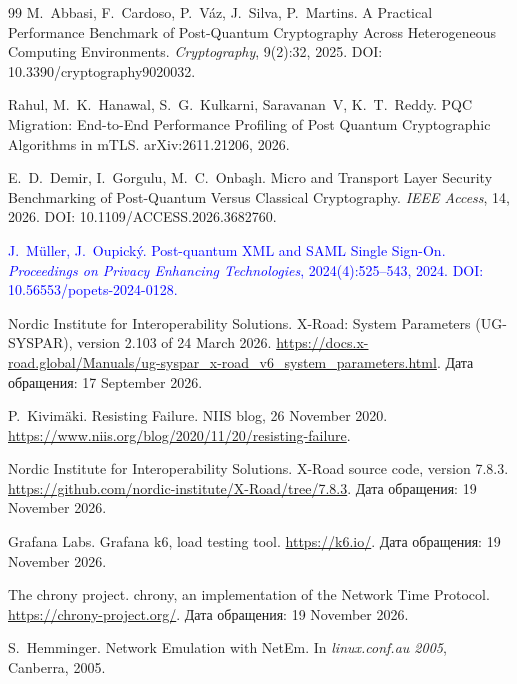 \documentclass[conference,a4paper]{IEEEtran}
\newcommand{\newtext}[1]{{\color{blue}#1}}
\begin{document}
\begin{thebibliography}{99}
\newtext{M.~Abbasi, F.~Cardoso, P.~V{\'a}z, J.~Silva, P.~Martins.
\newblock A Practical Performance Benchmark of Post-Quantum Cryptography Across Heterogeneous
Computing Environments.
\newblock \emph{Cryptography}, 9(2):32, 2025.
\newblock DOI: 10.3390/cryptography9020032.}

\newtext{Rahul, M.~K.~Hanawal, S.~G.~Kulkarni, Saravanan~V, K.~T.~Reddy.
\newblock PQC Migration: End-to-End Performance Profiling of Post Quantum Cryptographic Algorithms in
mTLS.
\newblock arXiv:2611.21206, 2026.}

\newtext{E.~D.~Demir, I.~Gorgulu, M.~C.~Onba{\c{s}}l{\i}.
\newblock Micro and Transport Layer Security Benchmarking of Post-Quantum Versus Classical
Cryptography.
\newblock \emph{IEEE Access}, 14, 2026.
\newblock DOI: 10.1109/ACCESS.2026.3682760.}

\textcolor{blue}{J.~M{\"u}ller, J.~Oupick{\'y}.
\newblock Post-quantum XML and SAML Single Sign-On.
\newblock \emph{Proceedings on Privacy Enhancing Technologies}, 2024(4):525--543, 2024.
\newblock DOI: 10.56553/popets-2024-0128.}

Nordic Institute for Interoperability Solutions.
\newblock X-Road: System Parameters (UG-SYSPAR)\newtext{, version 2.103 of 24 March 2026}.
\newblock \url{https://docs.x-road.global/Manuals/ug-syspar_x-road_v6_system_parameters.html}.
\newblock Дата обращения: 17 September 2026.

P.~Kivim\"{a}ki.
\newblock Resisting Failure.
\newblock NIIS blog, \newtext{26} November 2020.
\newblock \url{https://www.niis.org/blog/2020/11/20/resisting-failure}.
\newblock \newtext{Дата обращения: 19 November 2026.}

\newtext{Nordic Institute for Interoperability Solutions.
\newblock X-Road source code, version 7.8.3.
\newblock \url{https://github.com/nordic-institute/X-Road/tree/7.8.3}.
\newblock Дата обращения: 19 November 2026.}

\newtext{Grafana Labs.
\newblock Grafana k6, load testing tool.
\newblock \url{https://k6.io/}.
\newblock Дата обращения: 19 November 2026.}

\newtext{The chrony project.
\newblock chrony, an implementation of the Network Time Protocol.
\newblock \url{https://chrony-project.org/}.
\newblock Дата обращения: 19 November 2026.}

S.~Hemminger.
\newblock Network Emulation with NetEm.
\newblock In \emph{linux.conf.au 2005}, Canberra, 2005.


\end{thebibliography}
\end{document}
